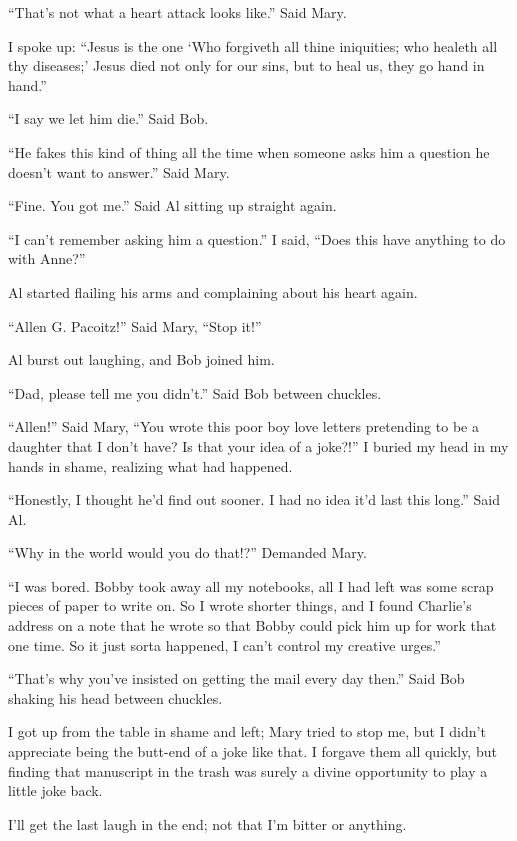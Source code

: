``That's not what a heart attack looks like.'' Said Mary.

I spoke up: ``Jesus is the one `Who forgiveth all thine iniquities; who healeth all thy diseases;' Jesus died not only for our sins, but to heal us, they go hand in hand.''

``I say we let him die.'' Said Bob.

``He fakes this kind of thing all the time when someone asks him a question he doesn't want to answer.'' Said Mary.

``Fine. You got me.'' Said Al sitting up straight again.

``I can't remember asking him a question.'' I said, ``Does this have anything to do with Anne?''

Al started flailing his arms and complaining about his heart again.

``Allen G. Pa\-co\-itz!'' Said Mary, ``Stop it!''

Al burst out laughing, and Bob joined him.

``Dad, please tell me you didn't.'' Said Bob between chuckles.

``Allen!'' Said Mary, ``You wrote this poor boy love letters pretending to be a daughter that I don't have? Is that your idea of a joke?!''
 I buried my head in my hands in shame, realizing what had happened.

``Honestly, I thought he'd find out sooner. I had no idea it'd last this long.'' Said Al.

``Why in the world would you do that!?'' Demanded Mary.

``I was bored. Bobby took away all my notebooks, all I had left was some scrap pieces of paper to write on. So I wrote shorter things, and I found Charlie's address on a note that he wrote so that Bobby could pick him up for work that one time. So it just sorta happened, I can't control my creative urges.''

``That's why you've insisted on getting the mail every day then.'' Said Bob shaking his head between chuckles.

I got up from the table in shame and left; Mary tried to stop me, but I didn't appreciate being the butt-end of a joke like that. I forgave them all quickly, but finding that manuscript in the trash was surely a divine opportunity to play a little joke back.

I'll get the last laugh in the end; not that I'm bitter or anything.
